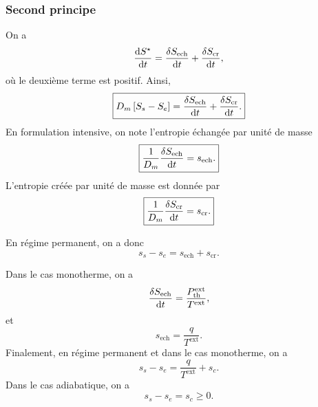         \subsubsection{Second principe}
            
            On a 
            \begin{equation*}
                \frac{\mathrm{d} S^{\star}}{\mathrm{d} t}=\frac{\delta S_{\text{ech}}}{\mathrm{d} t}+\frac{\delta S_{\text{cr}}}{\mathrm{d} t},
            \end{equation*}
            où le deuxième terme est positif. Ainsi,
            \begin{equation*}
                \boxed{
                    D_m\left[S_s-S_e\right]=\frac{\delta S_{\text{ech}}}{\mathrm{d} t}+\frac{\delta S_{\text{cr}}}{\mathrm{d} t}.
                }
            \end{equation*}
            En formulation intensive, on note l'entropie échangée par unité de masse
            \begin{equation*}
                \boxed{
                    \frac{1}{D_m}\frac{\delta S_{\text{ech}}}{\mathrm{d} t}=s_{\text{ech}}.
                }
            \end{equation*}
            L'entropie créée par unité de masse est donnée par
            \begin{equation*}
                \boxed{
                    \frac{1}{D_m}\frac{\delta S_{\text{cr}}}{\mathrm{d} t}=s_{\text{cr}}.
                }
            \end{equation*}

            En régime permanent, on a donc
            \begin{equation*}
                \boxed{s_s-s_e=s_{\text{ech}}+s_{\text{cr}}}.
            \end{equation*}

            Dans le cas monotherme, on a
            \begin{equation*}
                \frac{\delta S_{\text{ech}}}{\mathrm{d} t}=\frac{P_{\text{th}}^{\text{ext}}}{T^{\text{ext}}},
            \end{equation*}
            et
            \begin{equation*}
                \boxed{
                    s_{\text{ech}}=\frac{q}{T^{\text{ext}}}.
                }
            \end{equation*}
            Finalement, en régime permanent et dans le cas monotherme, on a
            \begin{equation*}
                \boxed{
                    s_s-s_e=\frac{q}{T^{\text{ext}}}+s_c.
                }
            \end{equation*}
            Dans le cas adiabatique, on a
            \begin{equation*}
                \boxed{
                    s_s-s_e=s_c\geqslant 0.
                }
            \end{equation*}

